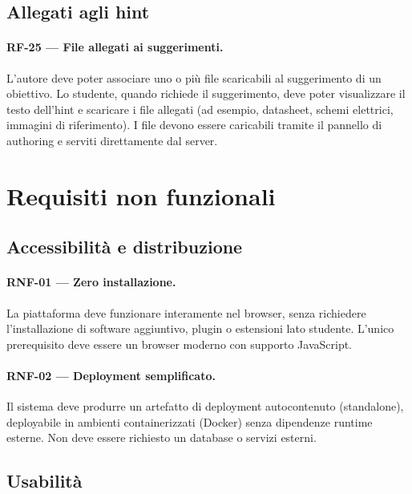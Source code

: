 \subsection{Allegati agli hint}
\label{subsec:rf-hint-files}

\paragraph{RF-25 --- File allegati ai suggerimenti.} L'autore deve poter associare uno o più file scaricabili al suggerimento di un obiettivo. Lo studente, quando richiede il suggerimento, deve poter visualizzare il testo dell'hint e scaricare i file allegati (ad esempio, datasheet, schemi elettrici, immagini di riferimento). I file devono essere caricabili tramite il pannello di authoring e serviti direttamente dal server.


\section{Requisiti non funzionali}
\label{sec:requisiti-non-funzionali}

\subsection{Accessibilità e distribuzione}
\label{subsec:rnf-accessibilita}

\paragraph{RNF-01 --- Zero installazione.} La piattaforma deve funzionare interamente nel browser, senza richiedere l'installazione di software aggiuntivo, plugin o estensioni lato studente. L'unico prerequisito deve essere un browser moderno con supporto JavaScript.

\paragraph{RNF-02 --- Deployment semplificato.} Il sistema deve produrre un artefatto di deployment autocontenuto (standalone), deployabile in ambienti containerizzati (Docker) senza dipendenze runtime esterne. Non deve essere richiesto un database o servizi esterni.

\subsection{Usabilità}
\label{subsec:rnf-usabilita}

